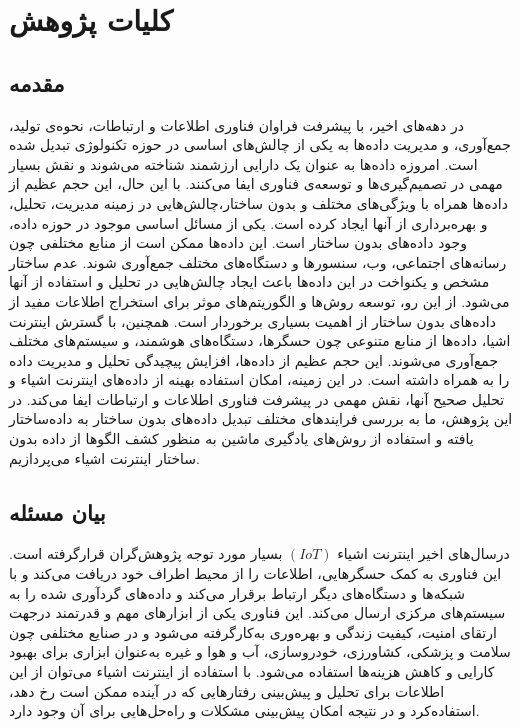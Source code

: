 % 
\chapter{کلیات پژوهش}\label{se:chapter1}

\section{مقدمه}
در دهه‌های اخیر، با پیشرفت فراوان فناوری اطلاعات و ارتباطات، نحوه‌ی تولید، جمع‌آوری، و مدیریت داده‌ها به یکی از چالش‌های اساسی در حوزه تکنولوژی تبدیل شده است. امروزه داده‌ها به عنوان یک دارایی ارزشمند شناخته می‌شوند و نقش بسیار مهمی در تصمیم‌گیری‌ها و توسعه‌ی فناوری ایفا می‌کنند. با این حال، این حجم عظیم از داده‌ها همراه با ویژگی‌های مختلف و بدون ساختار،چالش‌هایی در زمینه مدیریت، تحلیل، و بهره‌برداری از آنها ایجاد کرده است.
یکی از مسائل اساسی موجود در حوزه داده، وجود داده‌های بدون ساختار است. این داده‌ها ممکن است از منابع مختلفی چون رسانه‌های اجتماعی، وب، سنسورها و دستگاه‌های مختلف جمع‌آوری شوند. عدم ساختار مشخص و یکنواخت در این داده‌ها باعث ایجاد چالش‌هایی در تحلیل و استفاده از آنها می‌شود. از این رو، توسعه روش‌ها و الگوریتم‌های موثر برای استخراج اطلاعات مفید از داده‌های بدون ساختار از اهمیت بسیاری برخوردار است.
همچنین، با گسترش اینترنت اشیا، داده‌ها از منابع متنوعی چون حسگرها، دستگاه‌های هوشمند، و سیستم‌های مختلف جمع‌آوری می‌شوند. این حجم عظیم از داده‌ها، افزایش پیچیدگی تحلیل و مدیریت داده را به همراه داشته است. در این زمینه، امکان استفاده بهینه از داده‌های اینترنت اشیا‌ء و تحلیل صحیح آنها، نقش مهمی در پیشرفت فناوری اطلاعات و ارتباطات ایفا می‌کند.
در این پژوهش، ما به بررسی فرایندهای مختلف تبدیل داده‌های بدون ساختار به داده‌ساختار یافته و استفاده از روش‌های یادگیری ماشین به منظور کشف الگوها از داده‌ بدون ساختار اینترنت اشیاء می‌پردازیم.
\section{بیان مسئله}
درسال‌های اخیر اینترنت اشیاء $(IoT)$ بسیار مورد توجه پژوهش‌گران قرارگرفته‌ است. این فناوری به کمک حسگرهایی، ‌اطلاعات را از محیط اطراف خود دریافت می‌کند و با شبکه‌ها و دستگاه‌های دیگر ارتباط برقرار می‌کند و داده‌های گردآوری شده را به سیستم‌های مرکزی ارسال می‌کند. این فناوری یکی از ابزارهای مهم و قدرتمند درجهت ارتقای امنیت، کیفیت زندگی و بهره‌وری به‌کارگرفته می‌شود و در صنایع مختلفی چون سلامت و پزشکی، کشاورزی، خودروسازی، آب و هوا و غیره به‌عنوان ابزاری برای بهبود کارایی و کاهش هزینه‌ها استفاده می‌شود. با استفاده از اینترنت اشیاء می‌توان از این اطلاعات برای تحلیل و پیش‌بینی رفتارهایی که در آینده ممکن‌ است رخ‌ دهد، استفاده‌کرد و در نتیجه امکان پیش‌بینی مشکلات و راه‌حل‌هایی برای آن وجود ‌دارد.

